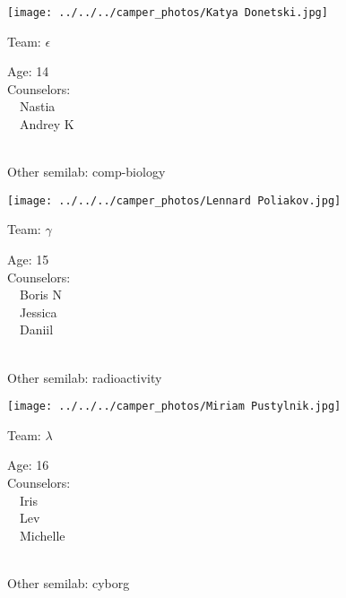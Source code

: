 \documentclass[10pt,letterpaper, landscape]{article}
\begin{document}
\horizontalshiftfornextsticker
\renewcommand{\baselinestretch}{1} \begin{sticker}
\noindent\begin{minipage}{0.5\textwidth}\texttt{[image: ../../../camper\_photos/Katya Donetski.jpg]}\end{minipage}\begin{minipage}{0.45\textwidth}
Team: {\Large $\epsilon$}

Age:        14\\
Counselors: \\\ \ Nastia\\\ \ Andrey K\\
\end{minipage} \\ \vspace{0.07in}
Other semilab: comp-biology
\end{sticker}
\horizontalshiftfornextsticker
\renewcommand{\baselinestretch}{1} \begin{sticker}
\noindent\begin{minipage}{0.5\textwidth}\texttt{[image: ../../../camper\_photos/Lennard Poliakov.jpg]}\end{minipage}\begin{minipage}{0.45\textwidth}
Team: {\Large $\gamma$}

Age:        15\\
Counselors: \\\ \ Boris N\\\ \ Jessica\\\ \ Daniil\\
\end{minipage} \\ \vspace{0.07in}
Other semilab: radioactivity
\end{sticker}
\verticalshiftfornextsticker
\renewcommand{\baselinestretch}{1} \begin{sticker}
\noindent\begin{minipage}{0.5\textwidth}\texttt{[image: ../../../camper\_photos/Miriam Pustylnik.jpg]}\end{minipage}\begin{minipage}{0.45\textwidth}
Team: {\Large $\lambda$}

Age:        16\\
Counselors: \\\ \ Iris\\\ \ Lev\\\ \ Michelle\\
\end{minipage} \\ \vspace{0.07in}
Other semilab: cyborg
\end{sticker}
\end{document}

